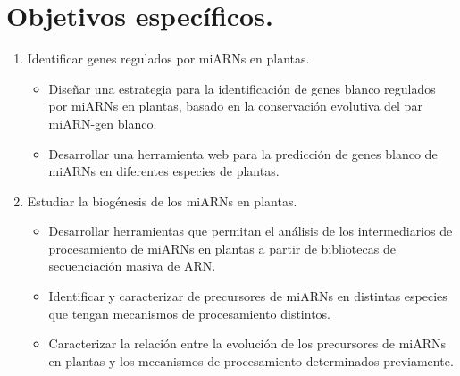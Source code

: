 \section{Objetivos específicos.}

\begin{enumerate}
    \item Identificar genes regulados por miARNs en plantas.
    \begin{itemize}
        \item Diseñar una estrategia para la identificación de genes blanco regulados por miARNs en plantas, basado en la conservación evolutiva del par miARN-gen blanco.
        \item Desarrollar una herramienta web para la predicción de genes blanco de miARNs en diferentes especies de plantas.		
    \end{itemize}
    \item Estudiar la biogénesis de los miARNs en plantas.
    \begin{itemize}
        \item Desarrollar herramientas que permitan el análisis de los intermediarios de procesamiento de miARNs en plantas a partir de bibliotecas de secuenciación masiva de ARN.
		\item Identificar y caracterizar de precursores de miARNs en distintas especies que tengan mecanismos de procesamiento distintos.
        \item Caracterizar la relación entre la evolución de los precursores de miARNs en plantas y los mecanismos de procesamiento determinados previamente.
    \end{itemize}
\end{enumerate}
